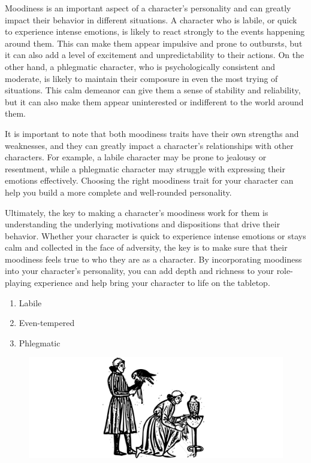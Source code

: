 \documentclass[12pt]{book}
\begin{document}
Moodiness is an important aspect of a character's personality and can greatly impact their behavior in different situations. A character who is labile, or quick to experience intense emotions, is likely to react strongly to the events happening around them. This can make them appear impulsive and prone to outbursts, but it can also add a level of excitement and unpredictability to their actions. On the other hand, a phlegmatic character, who is psychologically consistent and moderate, is likely to maintain their composure in even the most trying of situations. This calm demeanor can give them a sense of stability and reliability, but it can also make them appear uninterested or indifferent to the world around them.

It is important to note that both moodiness traits have their own strengths and weaknesses, and they can greatly impact a character's relationships with other characters. For example, a labile character may be prone to jealousy or resentment, while a phlegmatic character may struggle with expressing their emotions effectively. Choosing the right moodiness trait for your character can help you build a more complete and well-rounded personality.

Ultimately, the key to making a character's moodiness work for them is understanding the underlying motivations and dispositions that drive their behavior. Whether your character is quick to experience intense emotions or stays calm and collected in the face of adversity, the key is to make sure that their moodiness feels true to who they are as a character. By incorporating moodiness into your character's personality, you can add depth and richness to your role-playing experience and help bring your character to life on the tabletop.

\begin{enumerate}
    \item Labile
    \item Even-tempered
    \item Phlegmatic
\end{enumerate}

\begin{figure}[h]
    \centering
    \includegraphics[width=\textwidth]{./images/personality03.pdf}
\end{figure}
\end{document}
